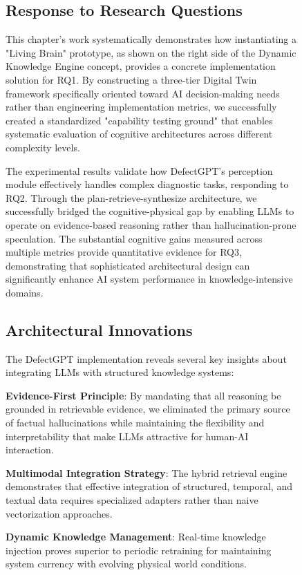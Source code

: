 \begin{figure}[htbp]
\subsection{Response to Research Questions}

This chapter's work systematically demonstrates how instantiating a "Living Brain" prototype, as shown on the right side of the Dynamic Knowledge Engine concept, provides a concrete implementation solution for RQ1. By constructing a three-tier Digital Twin framework specifically oriented toward AI decision-making needs rather than engineering implementation metrics, we successfully created a standardized "capability testing ground" that enables systematic evaluation of cognitive architectures across different complexity levels.

The experimental results validate how DefectGPT's perception module effectively handles complex diagnostic tasks, responding to RQ2. Through the plan-retrieve-synthesize architecture, we successfully bridged the cognitive-physical gap by enabling LLMs to operate on evidence-based reasoning rather than hallucination-prone speculation. The substantial cognitive gains measured across multiple metrics provide quantitative evidence for RQ3, demonstrating that sophisticated architectural design can significantly enhance AI system performance in knowledge-intensive domains.

\subsection{Architectural Innovations}

The DefectGPT implementation reveals several key insights about integrating LLMs with structured knowledge systems:

\textbf{Evidence-First Principle}: By mandating that all reasoning be grounded in retrievable evidence, we eliminated the primary source of factual hallucinations while maintaining the flexibility and interpretability that make LLMs attractive for human-AI interaction.

\textbf{Multimodal Integration Strategy}: The hybrid retrieval engine demonstrates that effective integration of structured, temporal, and textual data requires specialized adapters rather than naive vectorization approaches.

\textbf{Dynamic Knowledge Management}: Real-time knowledge injection proves superior to periodic retraining for maintaining system currency with evolving physical world conditions.


\end{figure}
